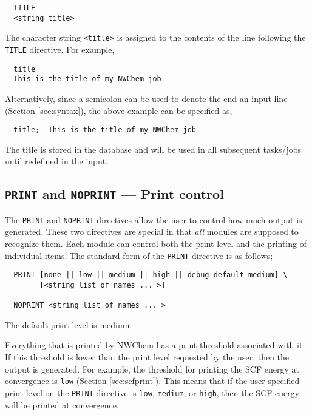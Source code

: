 \begin{verbatim}
  TITLE 
  <string title>
\end{verbatim}

The character string \verb+<title>+ is assigned to the contents of the
line following the \verb+TITLE+ directive.  For example,

\begin{verbatim}
  title
  This is the title of my NWChem job
\end{verbatim}

Alternatively, since a semicolon can be used to denote the end an input line
(Section \ref{sec:syntax}), the above example can be specified as,

\begin{verbatim}
  title;  This is the title of my NWChem job
\end{verbatim}

The title is stored in the database and will be used in all subsequent
tasks/jobs until redefined in the input.

\subsection{{\tt PRINT} and {\tt NOPRINT} --- Print control}
\label{sec:printcontrol}

The \verb+PRINT+ and \verb+NOPRINT+ directives allow the user to
control how much output is generated.  These two directives are
special in that {\em all} modules are supposed to recognize
them. Each module can control both the print
level and the printing of individual items.  The standard form of the
\verb+PRINT+ directive is as follows;

\begin{verbatim}
  PRINT [none || low || medium || high || debug default medium] \
        [<string list_of_names ... >]

  NOPRINT <string list_of_names ... >
\end{verbatim}
The default print level is medium.

Everything that is printed by NWChem has a print threshold associated
with it. If this threshold is lower than the print level requested by
the user, then the output is generated.  For example, the threshold
for printing the SCF energy at convergence is \verb+low+ (Section
\ref{sec:scfprint}).  This means that if the user-specified print level 
on the \verb+PRINT+ directive is
\verb+low+, \verb+medium+, or \verb+high+, then the
SCF energy will be printed at convergence.

